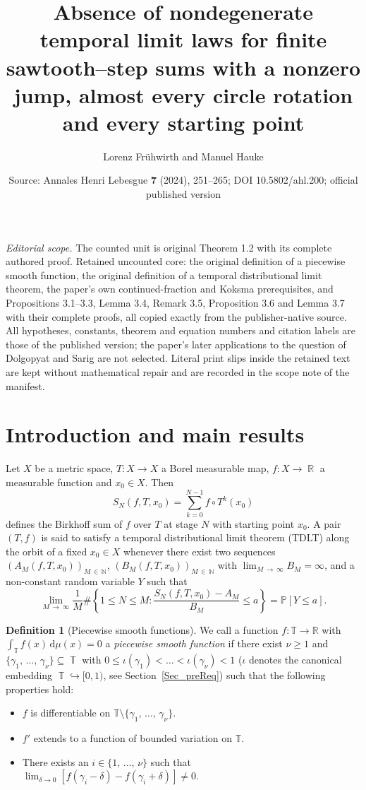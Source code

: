 \documentclass[10pt,a4paper]{amsart}
\title[No temporal distributional limit for finite sawtooth--step sums]{Absence of nondegenerate temporal limit laws for finite sawtooth--step sums with a nonzero jump, almost every circle rotation and every starting point}
\author{Lorenz Fr\"uhwirth and Manuel Hauke}
\date{Source: Annales Henri Lebesgue \textbf{7} (2024), 251--265; DOI 10.5802/ahl.200; official published version}
\numberwithin{equation}{section}
\DeclareMathOperator{\R}{\mathbb{R}}
\DeclareMathOperator{\T}{\mathbb{T}}
\newcommand{\bbN}{\mathbb{N}}
\newcommand{\bbT}{\mathbb{T}}
\newcommand{\bbP}{\mathbb{P}}
\newcommand{\bbR}{\mathbb{R}}
\newcommand{\rmd}{\mathrm{d}}
\theoremstyle{definition}
\newtheorem{defi}[theo]{Definition}
\begin{document}
\maketitle
\noindent\textit{Editorial scope.} The counted unit is original Theorem 1.2 with its complete authored proof. Retained uncounted core: the original definition of a piecewise smooth function, the original definition of a temporal distributional limit theorem, the paper's own continued-fraction and Koksma prerequisites, and Propositions 3.1--3.3, Lemma 3.4, Remark 3.5, Proposition 3.6 and Lemma 3.7 with their complete proofs, all copied exactly from the publisher-native source. All hypotheses, constants, theorem and equation numbers and citation labels are those of the published version; the paper's later applications to the question of Dolgopyat and Sarig are not selected. Literal print slips inside the retained text are kept without mathematical repair and are recorded in the scope note of the manifest.
\section{Introduction and main results}

Let $X$ be a metric space, $T : X \to X$ a Borel measurable map, $f: X \to \R$ a measurable function and $x_0 \in X$. Then
\[
S_N(f,T,x_0) = \sum_{k=0}^{N-1} f \circ T^k(x_0)
\]
defines the Birkhoff sum of $f$ over $T$ at stage $N$ with starting point $x_0$. A pair $(T,f)$ is said to satisfy a temporal distributional limit theorem (TDLT) along the orbit of a fixed $x_0 \in X$ whenever there exist two sequences $(A_M(f,T,x_0))_{M\,\in\,\bbN}$, $(B_M(f,T,x_0))_{M\,\in\,\bbN}$ with $\lim_{M\,\to\,\infty} B_M = \infty$, and a non-constant random variable $Y$ such that
\begin{equation}\label{TLT}
\lim_{M\,\to\,\infty} \frac{1}{M} \# \left\{1 \leq N \leq M: \frac{S_N(f,T,x_0) - A_M}{B_M} \leq a\right\} = \bbP[Y \leq a].
\end{equation}

\begin{defi}[Piecewise smooth functions]\label{def_fct1}
We call a function $f: \bbT \to \bbR$ with $\int_{\bbT} f(x)\,\rmd  \mu(x) = 0$ a \emph{piecewise smooth function} if there exist $ \nu \geq 1$ and $ \{\gamma_1,\,\ldots,\,\gamma_\nu \} \subseteq \T$ with $ 0 \leq \iota(\gamma_1) < \ldots < \iota(\gamma_{ \nu}) < 1$ ($\iota$ denotes the canonical embedding $\T \hookrightarrow [0,1)$, see Section~\ref{Sec_preReq}) such that the following properties hold:
\begin{itemize}
\item $f$ is differentiable on $\bbT\setminus \{\gamma_1,\,\ldots,\,\gamma_{\nu}\}$.
\item $f'$ extends to a function of bounded variation on $\bbT$.
\item There exists an $i \in \{1,\,\ldots,\,\nu\}$ such that $\lim_{ \delta \rightarrow 0} [f(\gamma_i - \delta) - f(\gamma_i+ \delta)] \neq 0$.
\end{itemize}
\end{defi}
\end{document}
